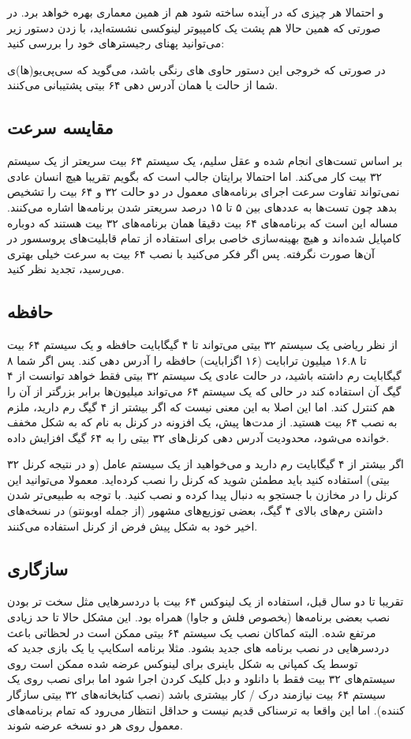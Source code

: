 و احتمالا هر چیزی که در آینده ساخته شود هم از همین معماری بهره خواهد برد. در صورتی که همین حالا هم پشت یک کامپیوتر لینوکسی نشسته‌اید، با زدن دستور زیر می‌توانید پهنای رجیسترهای خود را بررسی کنید:


در صورتی که خروجی این دستور حاوی 
های رنگی باشد، می‌گوید که سی‌پی‌یو(ها)ی شما از حالت 
یا همان آدرس دهی ۶۴ بیتی پشتیبانی می‌کنند.

\subsection*{مقایسه سرعت}
بر اساس تست‌های انجام شده و عقل سلیم، یک سیستم ۶۴ بیت سریعتر از یک سیستم ۳۲ بیت کار می‌کند. اما احتمالا برایتان جالب است که بگویم تقریبا هیچ انسان عادی نمی‌تواند تفاوت سرعت اجرای برنامه‌های معمول در دو حالت ۳۲ و ۶۴ بیت را تشخیص بدهد چون تست‌ها به عددهای بین ۵ تا ۱۵ درصد سریعتر شدن برنامه‌ها اشاره می‌کنند. مساله این است که برنامه‌های ۶۴ بیت دقیقا همان برنامه‌های ۳۲ بیت هستند که دوباره کامپایل شده‌اند و هیچ بهینه‌سازی خاصی برای استفاده از تمام قابلیت‌های پروسسور در آن‌ها صورت نگرفته. پس اگر فکر می‌کنید با نصب ۶۴ بیت به سرعت خیلی بهتری می‌رسید، تجدید نظر کنید.
\subsection*{حافظه}
از نظر ریاضی یک سیستم ۳۲ بیتی می‌تواند تا ۴ گیگابایت حافظه و یک سیستم ۶۴ بیت تا ۱۶.۸ میلیون ترابایت (۱۶ اگزابایت) حافظه را آدرس دهی کند. پس اگر شما ۸ گیگابایت رم داشته باشید، در حالت عادی یک سیستم ۳۲ بیتی فقط خواهد توانست از ۴ گیگ آن استفاده کند در حالی که یک سیستم ۶۴ می‌تواند میلیون‌ها برابر بزرگتر از آن‌ را هم کنترل کند. اما این اصلا به این معنی نیست که اگر بیشتر از ۴ گیگ رم دارید، ملزم به نصب ۶۴ بیت هستید. از مدت‌ها پیش، یک افزونه در کرنل به نام 
 که به شکل مخفف 
 خوانده می‌شود، محدودیت آدرس دهی کرنل‌های ۳۲ بیتی را به ۶۴ گیگ افزایش داده.
 
اگر بیشتر از ۴ گیگابایت رم دارید و می‌خواهید از یک سیستم عامل (و در نتیجه کرنل ۳۲ بیتی) استفاده کنید باید مطمئن شوید که کرنل 
 را نصب کرده‌اید. معمولا می‌توانید این کرنل را در مخازن با جستجو به دنبال 
 پیدا کرده و نصب کنید. با توجه به طبیعی‌تر شدن داشتن رم‌های بالای ۴ گیگ، بعضی توزیع‌های مشهور (از جمله اوبونتو) در نسخه‌های اخیر خود به شکل پیش فرض از کرنل 
 استفاده می‌کنند.
\subsection*{سازگاری}
تقریبا تا دو سال قبل، استفاده از یک لینوکس ۶۴ بیت با دردسرهایی مثل سخت تر بودن نصب بعضی برنامه‌ها (بخصوص فلش و جاوا) همراه بود. این مشکل حالا تا حد زیادی مرتفع شده. البته کماکان نصب یک سیستم ۶۴ بیتی ممکن است در لحظاتی باعث دردسرهایی در نصب برنامه های جدید بشود. مثلا برنامه اسکایپ یا یک بازی جدید که توسط یک کمپانی به شکل باینری برای لینوکس عرضه شده ممکن است روی سیستم‌های ۳۲ بیت فقط با دانلود و دبل کلیک کردن اجرا شود اما برای نصب روی یک سیستم ۶۴ بیت نیازمند درک / کار بیشتری باشد (نصب کتابخانه‌های ۳۲ بیتی سازگار کننده). اما این واقعا به ترسناکی قدیم نیست و حداقل انتظار می‌رود که تمام برنامه‌های معمول روی هر دو نسخه عرضه شوند.

